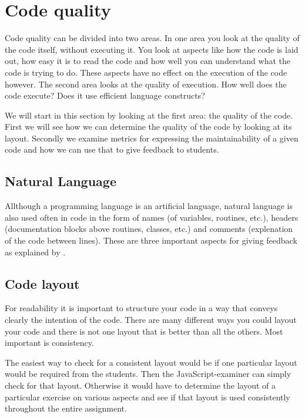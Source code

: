 \section{Code quality}

Code quality can be divided into two areas. In one area you look at the quality
of the code itself, without executing it. You look at aspects like how the code
is laid out, how easy it is to read the code and how well you can understand
what the code is trying to do. These aspects have no effect on the execution of
the code however. The second area looks at the quality of execution. How well
does the code execute? Does it use efficient language constructs?

We will start in this section by looking at the first area: the quality of the
code. First we will see how we can determine the quality of the code by looking
at its layout. Secondly we examine metrics for expressing the maintainability
of a given code and how we can use that to give feedback to students.

\subsection{Natural Language}

Allthough a programming language is an artificial language,
natural language is also used often in code in the form of
names (of variables, routines, etc.),
headers (documentation blocks above routines, classes, etc.)
and comments (explenation of the code between lines).
These are three important aspects for giving feedback
as explained by \citet{stegeman2014empirically}.


\subsection{Code layout}

For readability it is important to structure your code in a way that conveys clearly the intention of the code. There are many different ways you could layout your code and there is not one layout that is better than all the others. Most important is consistency.

The easiest way to check for a consistent layout would be if one particular layout would be required from the students. Then the JavaScript-examiner can simply check for that layout. Otherwise it would have to determine the layout of a particular exercise on various aspects and see if that layout is used consistently throughout the entire assignment.

